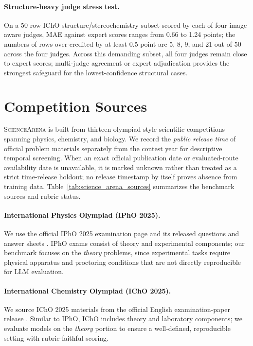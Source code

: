 \documentclass[11pt]{article}
\begin{document}
\paragraph{Structure-heavy judge stress test.}
On a 50-row IChO structure/stereochemistry subset scored by each of four image-aware judges, MAE against expert scores ranges from 0.66 to 1.24 points; the numbers of rows over-credited by at least 0.5 point are 5, 8, 9, and 21 out of 50 across the four judges.
Across this demanding subset, all four judges remain close to expert scores; multi-judge agreement or expert adjudication provides the strongest safeguard for the lowest-confidence structural cases.

\section{Competition Sources}
\label{app:competitions}

\textsc{ScienceArena} is built from thirteen olympiad-style scientific competitions spanning physics, chemistry, and biology. We record the \emph{public release time} of official problem materials separately from the contest year for descriptive temporal screening. When an exact official publication date or evaluated-route availability date is unavailable, it is marked unknown rather than treated as a strict time-release holdout; no release timestamp by itself proves absence from training data. Table~\ref{tab:science_arena_sources} summarizes the benchmark sources and rubric status.

\paragraph{International Physics Olympiad (IPhO 2025).}
We use the official IPhO 2025 examination page and its released questions and answer sheets \citep{ipho2025_official_questions}. IPhO exams consist of theory and experimental components; our benchmark focuses on the \emph{theory} problems, since experimental tasks require physical apparatus and proctoring conditions that are not directly reproducible for LLM evaluation.

\paragraph{International Chemistry Olympiad (IChO 2025).}
We source IChO 2025 materials from the official English examination-paper release \citep{icho2025_problems_page}. Similar to IPhO, IChO includes theory and laboratory components; we evaluate models on the \emph{theory} portion to ensure a well-defined, reproducible setting with rubric-faithful scoring.
\end{document}
